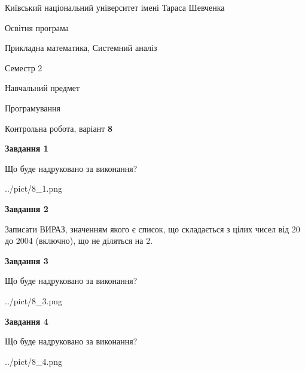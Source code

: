 \documentclass[12pt, ukrainian]{article}
\begin{document}
{{\begin {small}\par
{ \center  Київський національний університет імені Тараса Шевченка \par}
{\parbox {5 cm}{Освітня програма \hfill}{\parbox {8 cm}{Прикладна математика, Системний аналіз \hfill}}\parbox {5 cm}{\hfill Семестр 2}}\par
{\parbox {5 cm} {Навчальний предмет \hfill}\parbox {7 cm}{Програмування \hfill}\parbox {6cm}{\hfill}\par}\vspace{-7pt} \end{small}}{\center Контрольна робота, варіант  \No \textbf
{ 8 }\par}}
{
\begin {large}
{\begin {center}\textbf{Завдання 1}\end {center}}\par
Що буде надруковано за виконання?\par\par
\begin{center}
	{../pict/8_1.png}
\end{center}
\newpage

{\begin {center}\textbf{Завдання 2}\end {center}}\par

Записати ВИРАЗ, значенням якого є список, що складається з цілих чисел від 20 до 2004 (включно), що не діляться на 2.\par
\newpage

{\begin {center}\textbf{Завдання 3}\end {center}}\par
Що буде надруковано за виконання?\par
\begin{center}
	{../pict/8_3.png}
\end{center}
\newpage

{\begin {center}\textbf{Завдання 4}\end {center}}\par
Що буде надруковано за виконання?\par
\begin{center}
	{../pict/8_4.png}
\end{center}
\newpage


\end{large}}
\end{document}

